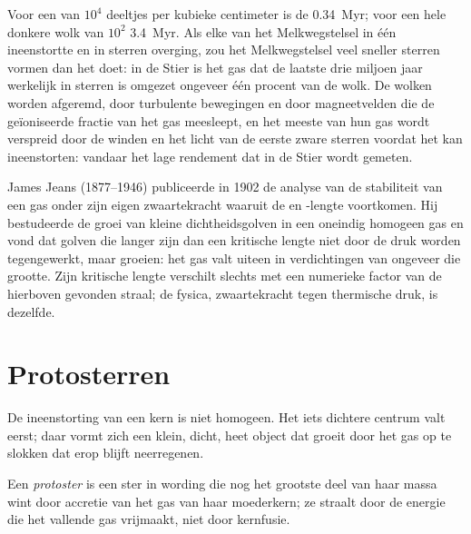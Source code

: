 Voor een  van $10^4$ deeltjes per kubieke centimeter is de 
\qty{0.34}{Myr}; voor een hele donkere wolk van $10^2$ \qty{3.4}{Myr}. Als elke
 van het Melkwegstelsel in één  ineenstortte en in
sterren overging, zou het Melkwegstelsel veel sneller sterren vormen dan het doet: in de Stier is het gas dat
de laatste drie miljoen jaar werkelijk in sterren is omgezet ongeveer één procent van de wolk. De
wolken worden afgeremd, door turbulente bewegingen en door magneetvelden die de
geïoniseerde fractie van het gas meesleept, en het meeste van hun gas wordt verspreid door
de winden en het licht van de eerste zware sterren voordat het kan ineenstorten: vandaar
het lage rendement dat in de Stier wordt gemeten.

\begin{history}
James Jeans (1877--1946) publiceerde in 1902 de analyse van de stabiliteit van een
gas onder zijn eigen zwaartekracht waaruit de  en -lengte voortkomen. Hij
bestudeerde de groei van kleine dichtheidsgolven in een oneindig homogeen gas en
vond dat golven die langer zijn dan een kritische lengte niet door de druk worden tegengewerkt,
maar groeien: het gas valt uiteen in verdichtingen van ongeveer die grootte. Zijn kritische
lengte verschilt slechts met een numerieke factor van de hierboven gevonden straal; de
fysica, zwaartekracht tegen thermische druk, is dezelfde.
\end{history}

\section{Protosterren}

De ineenstorting van een kern is niet homogeen. Het iets dichtere centrum valt
eerst; daar vormt zich een klein, dicht, heet object dat groeit door het gas op te slokken
dat erop blijft neerregenen.

\begin{definition}[Protoster]\label{def:b2:ism-star-formation:protostar}
Een \emph{protoster} is een ster in wording die nog het grootste
deel van haar massa wint door accretie van het gas van haar moederkern; ze
straalt door de energie die het vallende gas vrijmaakt, niet door kernfusie.
\end{definition}

